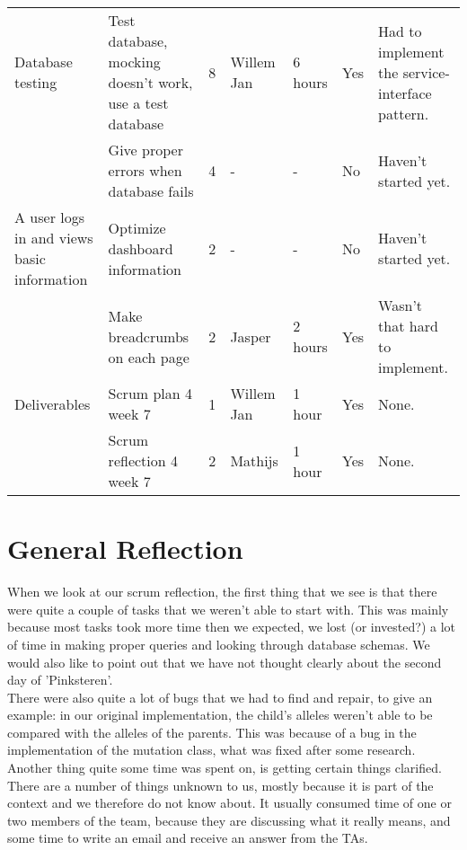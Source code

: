\documentclass[a4paper]{report}
\begin{document}
\begin{landscape}
\begin{longtable}{p{3cm}|p{5cm}|l|l|l|l|p{7cm}}
Database testing 
& Test database, mocking doesn't work, use a test database & 8 & Willem Jan & 6 hours & Yes & Had to implement the service-interface pattern.\\
& Give proper errors when database fails & 4 & - & - & No & Haven't started yet.\\
\hline

A user logs in and views basic information 
& Optimize dashboard information & 2 & - & - & No & Haven't started yet.\\
& Make breadcrumbs on each page & 2 & Jasper & 2 hours & Yes & Wasn't that hard to implement.\\
\hline

Deliverables 
& Scrum plan 4 week 7 & 1 & Willem Jan & 1 hour & Yes & None.\\
& Scrum reflection 4 week 7 & 2 & Mathijs & 1 hour & Yes & None.\\
\hline
\end{longtable}
\end{landscape}

\section*{General Reflection}
When we look at our scrum reflection, the first thing that we see is that there were quite a couple of tasks that we weren't able to start with. This was mainly because most tasks took more time then we expected, we lost (or invested?) a lot of time in making proper queries and looking through database schemas. We would also like to point out that we have not thought clearly about the second day of 'Pinksteren'.\\
There were also quite a lot of bugs that we had to find and repair, to give an example: in our original implementation, the child's alleles weren't able to be compared with the alleles of the parents. This was because of a bug in the implementation of the mutation class, what was fixed after some research. \\
Another thing quite some time was spent on, is getting certain things clarified. There are a number of things unknown to us, mostly because it is part of the context and we therefore do not know about. It usually consumed time of one or two members of the team, because they are discussing what it really means, and some time to write an email and receive an answer from the TAs.
\end{document}
